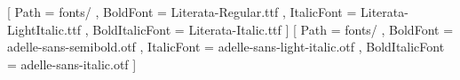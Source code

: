 

\usepackage{scrlayer-scrpage}
\usepackage{needspace}
\usepackage[]{titlesec}
\usepackage[]{ccicons}
\usepackage{fontawesome5}
\usepackage{marginnote}
\usepackage{sidenotes}
\usepackage{booktabs}

\raggedbottom

\usepackage{xcolor}

\usepackage{fontspec}
\setmainfont{Literata-Light.ttf}[
	Path           = fonts/ ,
    BoldFont       = Literata-Regular.ttf ,
    ItalicFont     = Literata-LightItalic.ttf ,
    BoldItalicFont = Literata-Italic.ttf ]
\setsansfont{adelle-sans-light.otf}[
	Path           = fonts/ ,
    BoldFont       = adelle-sans-semibold.otf ,
    ItalicFont     = adelle-sans-light-italic.otf ,
    BoldItalicFont = adelle-sans-italic.otf ]
\setmonofont[Scale=0.90]{LFT Etica Mono}
\renewcommand{\footnotesize}{\scriptsize}
\renewcommand{\captionsize}{\footnotesize}
\renewcommand{\marginfont}{\color{RacingGreen}\sffamily\scriptsize}

\usepackage{enumitem}
\renewcommand{\labelitemi}{}

\titlespacing*{\chapter}{0em}{0em}{2em}
\titlespacing*{\section}{0mm}{10mm}{0mm}
\titlespacing*{\subsection}{0mm}{8mm}{0mm}
\titlespacing*{\subsubsection}{0mm}{3mm}{0mm}
\titlespacing*{\paragraph}{0mm}{3mm}{0mm}

